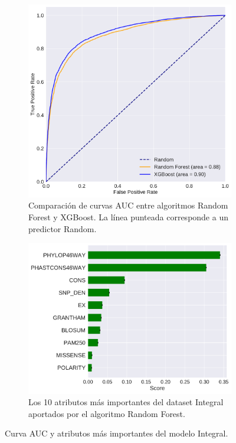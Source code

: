 \newpage

\begin{figure}[H]
\centering
\begin{subfigure}[t]{0.7\textwidth}
    \centering
    \includegraphics[width=\textwidth]{documents/latex/figures/3/integral/auc_integral.pdf}
    \caption{Comparación de curvas AUC entre algoritmos Random Forest y XGBoost. La línea punteada corresponde a un predictor Random.}
    \label{fig:auc_integral}
\end{subfigure}
\hfill
\hfill
\begin{subfigure}[b]{0.7\textwidth}
    \centering
    \includegraphics[width=\textwidth]{documents/latex/figures/3/integral/importances_integral.pdf}
    \caption{Los 10 atributos más importantes del dataset Integral aportados por el algoritmo Random Forest.}
    \label{fig:importances_integral}
\end{subfigure}

\caption{Curva AUC y atributos más importantes del modelo Integral.}

\end{figure}

